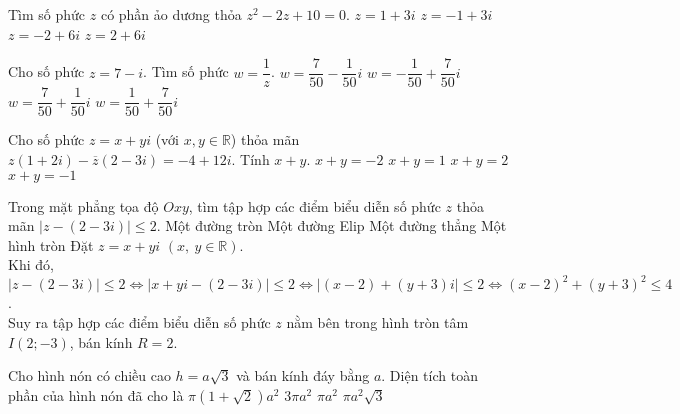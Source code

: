 \begin{ex}%
	Tìm số phức $ z $ có phần ảo dương thỏa $ z^2-2z+10=0 $.
	\choice
	{\True $ z=1+3i $}
	{$ z=-1+3i $}
	{$ z=-2+6i $}
	{$ z=2+6i $}
\end{ex}

\begin{ex}%
	Cho số phức $z=7-i$. Tìm số phức $w=\dfrac{1}{z}$.
	\choice
	{$w=\dfrac{7}{50}-\dfrac{1}{50}i$}
	{$w=-\dfrac{1}{50}+\dfrac{7}{50}i$}
	{\True $w=\dfrac{7}{50}+\dfrac{1}{50}i$}
	{$w=\dfrac{1}{50}+\dfrac{7}{50}i$}
\end{ex}

\begin{ex}%
	Cho số phức $z=x+yi$ (với $x,y \in \mathbb{R}$) thỏa mãn $z(1+2i)-\overline{z}(2-3i)=-4+12i$. Tính $x+y$.
	\choice
	{$x+y=-2$}
	{$x+y=1$}
	{\True $x+y=2$}
	{$x+y=-1$}
\end{ex}

\begin{ex}%
	Trong mặt phẳng tọa độ $Oxy$, tìm tập hợp các điểm biểu diễn số phức $z$ thỏa mãn $|z-(2-3i)|\le2$.
	\choice
	{Một đường tròn}
	{Một đường Elip}
	{Một đường thẳng}
	{\True Một hình tròn}
	\loigiai
	{
		Đặt $z=x+yi$ $(x,~y\in\mathbb{R})$.\\
		Khi đó, $|z-(2-3i)|\le2\Leftrightarrow |x+yi-(2-3i)|\le2\Leftrightarrow |(x-2)+(y+3)i|\le2\Leftrightarrow (x-2)^2+(y+3)^2\le4$.\\
		Suy ra tập hợp các điểm biểu diễn số phức $z$ nằm bên trong hình tròn tâm $I(2;-3)$, bán kính $R=2$.
	}
\end{ex}

\begin{ex}%
	Cho hình nón có chiều cao $h=a\sqrt{3}$ và bán kính đáy bằng $a$. Diện tích toàn phần của hình nón đã cho là
	\choice
	{$\pi(1+\sqrt{2})a^2$}
	{\True $3\pi a^2$}
	{$\pi a^2$}
	{$\pi a^2\sqrt{3}$}
\end{ex}


